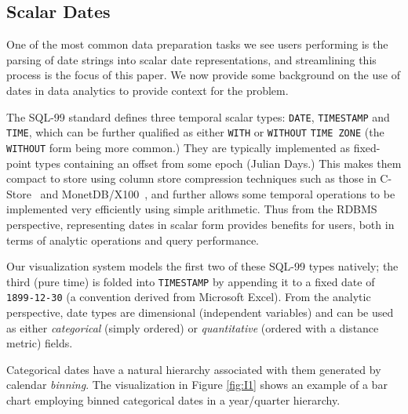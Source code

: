 \subsection{Scalar Dates}

One of the most common data preparation tasks we see users performing is the parsing of date strings into scalar date representations, and streamlining this process is the focus of this paper. We now provide some background on the use of dates in data analytics to provide context for the problem. 

The SQL-99 standard defines three temporal scalar types: \texttt{DATE}, \texttt{TIMESTAMP} and \texttt{TIME}, which can be further qualified as either \texttt{WITH} or \texttt{WITHOUT} \texttt{TIME ZONE} (the \texttt{WITHOUT} form being more common.) They are typically implemented as fixed-point types containing an offset from some epoch (\eg Julian Days.) This makes them compact to store using column store compression techniques such as those in C-Store~\cite{Stonebraker:2005} and MonetDB/X100~\cite{Zukowski:2006}, and further allows some temporal operations to be implemented very efficiently using simple arithmetic. Thus from the RDBMS perspective, representing dates in scalar form provides  benefits for users, both in terms of analytic operations and query performance.

Our visualization system models the first two of these SQL-99 types natively; the third (pure time) is folded into \texttt{TIMESTAMP} by appending it to a fixed date of \texttt{1899-12-30} (a convention derived from Microsoft Excel). From the analytic perspective, date types are dimensional (\ie independent variables) and can be used as either \textit{categorical} (simply ordered) or \textit{quantitative} (ordered with a distance metric) fields.

Categorical dates have a natural hierarchy associated with them generated by calendar \textit{binning}. The visualization in Figure \ref{fig:I1} shows an example of a bar chart employing binned categorical dates in a year/quarter hierarchy.


